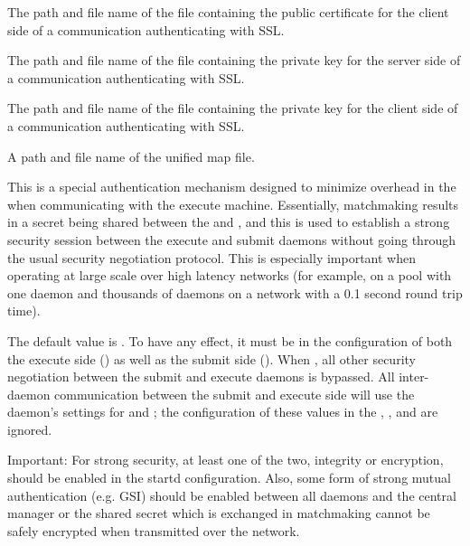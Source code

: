 \begin{description}
\label{param:AuthSSLClientCertfile}
\item[\Macro{AUTH\_SSL\_CLIENT\_CERTFILE}]
  The path and file name of the file containing the public certificate
  for the client side of a communication authenticating with SSL.


\label{param:AuthSSLServerKeyfile}
\item[\Macro{AUTH\_SSL\_SERVER\_KEYFILE}]
  The path and file name of the file containing the private key
  for the server side of a communication authenticating with SSL.

\label{param:AuthSSLClientKeyfile}
\item[\Macro{AUTH\_SSL\_CLIENT\_KEYFILE}]
  The path and file name of the file containing the private key
  for the client side of a communication authenticating with SSL.


\label{param:CertificateMapfile}
\item[\Macro{CERTIFICATE\_MAPFILE}]
  A path and file name of the unified map file.

\label{param:SecEnableMatchPasswordAuthentication}
\item[\Macro{SEC\_ENABLE\_MATCH\_PASSWORD\_AUTHENTICATION}]
  This is a special authentication mechanism designed to minimize
  overhead in the  when communicating with the execute
  machine.  Essentially, matchmaking results in a secret being shared
  between the  and , and this is used to
  establish a strong security session between the execute and submit
  daemons without going through the usual security negotiation protocol.
  This is especially important when operating at large scale over high
  latency networks (for example, on a pool with one  daemon
  and thousands of  daemons on a network with a 0.1 second 
  round trip time).

  The default value is .  
  To have any effect, it must be  in the configuration of both
  the execute side () as well as the submit side 
  ().
  When ,
  all other security negotiation
  between the submit and execute daemons is bypassed.  All inter-daemon
  communication between the submit and execute side will use the
   daemon's settings for  and
  ; the configuration of these values in
  the , , and  are ignored.

  Important: For strong security, at least one of the two, integrity or
  encryption, should be enabled in the startd configuration.  Also, some
  form of strong mutual authentication (e.g. GSI) should be enabled
  between all daemons and the central manager or the shared secret which
  is exchanged in matchmaking cannot be safely encrypted when transmitted
  over the network.


\end{description}

